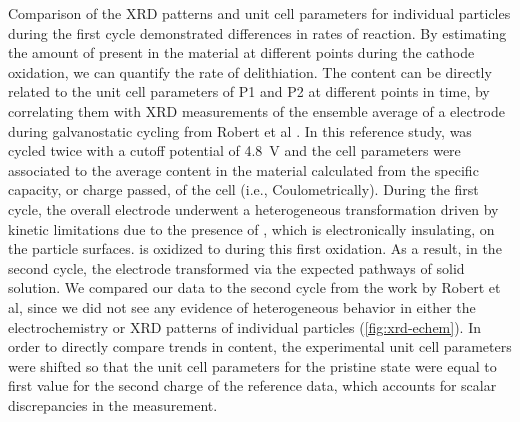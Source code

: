 \documentclass{article}
\begin{document}
Comparison of the XRD patterns and unit cell parameters for individual
particles during the first cycle demonstrated differences in rates of
reaction. By estimating the amount of  present in the material
at different points during the cathode oxidation, we can quantify the
rate of delithiation. The  content can be directly related to
the unit cell parameters of P1 and P2 at different points in time, by
correlating them with XRD measurements of the ensemble average of a
\nca{} electrode during galvanostatic cycling from Robert et al
\cite{Robert2015}. In this reference study, \nca{} was cycled twice
with a cutoff potential of \SI{4.8}{\volt} and the cell parameters
were associated to the average  content in the material
calculated from the specific capacity, or charge passed, of the cell
(i.e., Coulometrically). During the first cycle, the overall \nca{}
electrode underwent a heterogeneous transformation driven by kinetic
limitations due to the presence of , which is
electronically insulating, on the particle surfaces.  is
oxidized to  during this first oxidation. As a result, in the
second cycle, the electrode transformed via the expected pathways of
solid solution. We compared our data to the second cycle from the work
by Robert et al, since we did not see any evidence of heterogeneous
behavior in either the electrochemistry or XRD patterns of individual
particles (\ref{fig:xrd-echem}). In order to directly compare trends
in  content, the experimental unit cell parameters were shifted
so that the unit cell parameters for the pristine state were equal to
first value for the second charge of the reference data, which
accounts for scalar discrepancies in the measurement.
\end{document}
